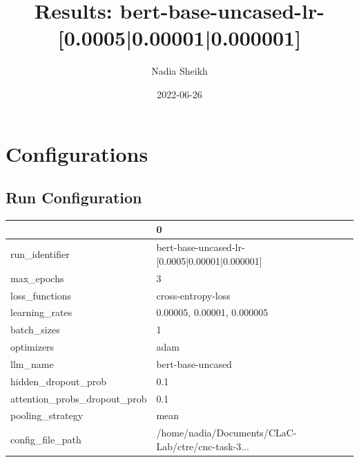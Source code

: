 \documentclass{article}
\title{Results: bert-base-uncased-lr-[0.0005|0.00001|0.000001]}
\author{Nadia Sheikh}
\date{2022-06-26}
\begin{document}
\maketitle
\section{Configurations}
\subsection{Run Configuration}
\begin{tabular}{ll}
\toprule
{} &                                                  0 \\
\midrule
run\_identifier               &     bert-base-uncased-lr-[0.0005|0.00001|0.000001] \\
max\_epochs                   &                                                  3 \\
loss\_functions               &                                 cross-entropy-loss \\
learning\_rates               &                         0.00005, 0.00001, 0.000005 \\
batch\_sizes                  &                                                  1 \\
optimizers                   &                                               adam \\
llm\_name                     &                                  bert-base-uncased \\
hidden\_dropout\_prob          &                                                0.1 \\
attention\_probs\_dropout\_prob &                                                0.1 \\
pooling\_strategy             &                                               mean \\
config\_file\_path             &  /home/nadia/Documents/CLaC-Lab/ctre/cnc-task-3... \\
\bottomrule
\end{tabular}
\end{document}
